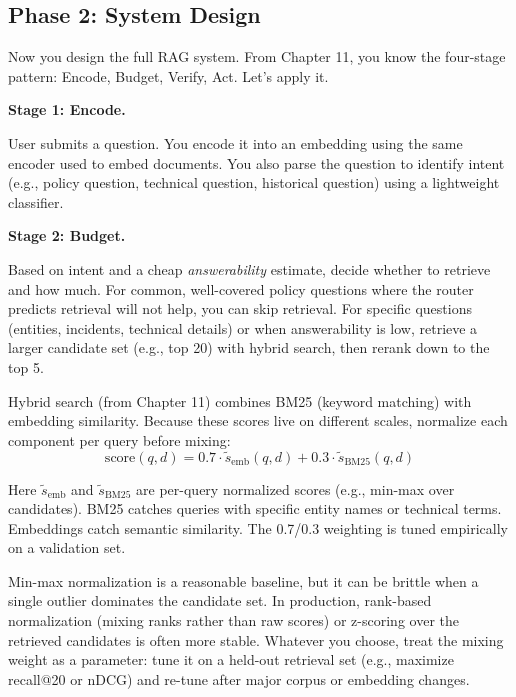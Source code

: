 \vspace{1em}

\subsection{Phase 2: System Design}

Now you design the full RAG system. From Chapter 11, you know the four-stage pattern: Encode, Budget, Verify, Act. Let's apply it.

\textbf{Stage 1: Encode.}

User submits a question. You encode it into an embedding using the same encoder used to embed documents. You also parse the question to identify intent (e.g., policy question, technical question, historical question) using a lightweight classifier.

\textbf{Stage 2: Budget.}

Based on intent and a cheap \emph{answerability} estimate, decide whether to retrieve and how much. For common, well-covered policy questions where the router predicts retrieval will not help, you can skip retrieval. For specific questions (entities, incidents, technical details) or when answerability is low, retrieve a larger candidate set (e.g., top 20) with hybrid search, then rerank down to the top 5.

Hybrid search (from Chapter 11) combines BM25 (keyword matching) with embedding similarity. Because these scores live on different scales, normalize each component per query before mixing:
\begin{equation}
\text{score}(q, d) = 0.7 \cdot \tilde{s}_{\text{emb}}(q, d) + 0.3 \cdot \tilde{s}_{\text{BM25}}(q, d)
\end{equation}

Here $\tilde{s}_{\text{emb}}$ and $\tilde{s}_{\text{BM25}}$ are per-query normalized scores (e.g., min-max over candidates). BM25 catches queries with specific entity names or technical terms. Embeddings catch semantic similarity. The 0.7/0.3 weighting is tuned empirically on a validation set.

Min-max normalization is a reasonable baseline, but it can be brittle when a single outlier dominates the candidate set. In production, rank-based normalization (mixing ranks rather than raw scores) or z-scoring over the retrieved candidates is often more stable. Whatever you choose, treat the mixing weight as a parameter: tune it on a held-out retrieval set (e.g., maximize recall@20 or nDCG) and re-tune after major corpus or embedding changes.


